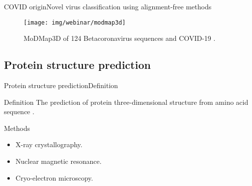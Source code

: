 \documentclass[10pt]{beamer}
\newcommand{\1}{
        	\setbeamertemplate{background}{
        		\texttt{[image: img/1]}
        		\tikz[overlay] \fill[fill opacity=0.75,fill=white] (0,0) rectangle (-\paperwidth,\paperheight);
        	}
}
\begin{document}
\begin{frame}{COVID origin}{Novel virus classification using alignment-free methods}
	\begin{figure}[]
		\centering
		\texttt{[image: img/webinar/modmap3d]}
		\label{img:mot2}
		\caption{MoDMap3D of 124 Betacoronavirus sequences and COVID-19 \cite{randhawa2020machine}.}
	\end{figure}
\end{frame}


\subsection{Protein structure prediction}

\begin{frame}{Protein structure prediction}{Definition}
	\begin{block}{Definition}
		The prediction of protein three-dimensional structure from amino acid sequence \cite{kuhlman2019advances}.
	\end{block}

	\pause
	\begin{block}{Methods}
		\begin{itemize}
			\item X-ray crystallography.
			\item Nuclear magnetic resonance.
			\item Cryo-electron microscopy.
		\end{itemize}
	\end{block}
\end{frame}
\end{document}
